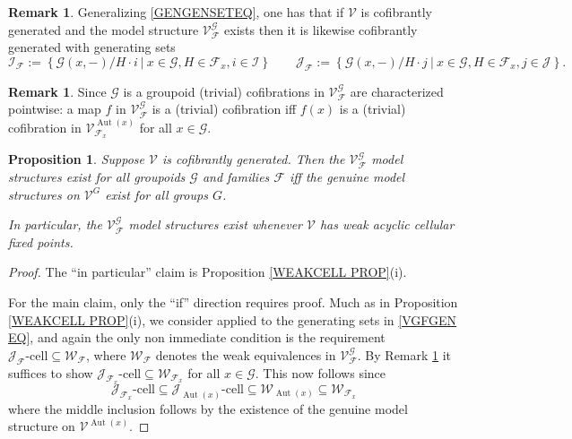 \documentclass[a4paper,10pt
,draft
]{article}%
\numberwithin{equation}{section}
\numberwithin{figure}{section}
\newtheorem{proposition}[equation]{Proposition}%
\theoremstyle{definition} %
\newtheorem{remark}[equation]{Remark}%
\DeclareMathOperator{\Aut}{Aut}%
\newcommand{\F}{\ensuremath{\mathcal F}}
\newcommand{\V}{\ensuremath{\mathcal V}}
\newcommand{\G}{\ensuremath{\mathcal G}}
\newcommand{\1}{\ensuremath{\mathbbm 1}}%
\begin{document}
\begin{remark}\label{VGFGEN REM}
	Generalizing \eqref{GENGENSETEQ}, one has that if 
	$\V$ is cofibrantly generated and 
	the model structure $\V^{\G}_{\F}$ exists
	then it is likewise cofibrantly generated with generating sets
\begin{equation}\label{VGFGEN EQ}
	\mathcal I_{\F} := \left\{
	\G(x,-)/H \cdot i
	\ | \ x \in \G, H \in \F_x, i\in \mathcal{I}
	\right\}
	\qquad
	\mathcal J_{\F} := \left\{
	\G(x,-)/H \cdot j
	\ | \ x \in \G, H \in \F_x, j\in \mathcal{J}
	\right\}.
\end{equation}
\end{remark}


\begin{remark}\label{SIGMACOF_REM}
	Since $\G$ is a groupoid 
	(trivial) cofibrations in $\V^{\G}_{\F}$
	are characterized pointwise:
	a map $f$ in $\V^\G_\F$ is a (trivial) cofibration iff $f(x)$ is a (trivial) cofibration in $\V^{\Aut(x)}_{\F_x}$ for all $x \in \G$.
\end{remark}



\begin{proposition}\label{ALLEQ PROP}
Suppose $\V$ is cofibrantly generated.
%
Then the $\V^{\G}_{\F}$
model structures exist for all 
groupoids $\G$ and families $\F$
iff
the genuine model structures on $\V^G$
exist for all groups $G$.

In particular, the $\V^{\G}_{\F}$
model structures exist whenever $\V$ has weak acyclic cellular fixed points.
\end{proposition}

\begin{proof}
The ``in particular'' claim is Proposition \ref{WEAKCELL PROP}(i).

For the main claim, only the ``if'' direction requires proof.
Much as in Proposition \ref{WEAKCELL PROP}(i), 
we consider \cite[Theorem 2.1.19]{Hov99}
applied to the generating sets in \eqref{VGFGEN EQ},
and again the only non immediate condition is the requirement
$\mathcal{J}_{\F}\text{-cell} \subseteq \mathcal{W}_{\F}$,
where $\mathcal{W}_{\F}$ denotes the weak equivalences 
in $\V^{\G}_{\F}$.
By Remark \ref{SIGMACOF_REM} it suffices to show 
$\mathcal{J}_{\F_x}\text{-cell} \subseteq \mathcal{W}_{\F_x}$
for all $x \in \G$.
This now follows since
\begin{equation}\label{FAMTOGEN EQ}
\mathcal{J}_{\F_x}\text{-cell} \subseteq 
\mathcal{J}_{\Aut(x)}\text{-cell} \subseteq 
\mathcal{W}_{\Aut(x)} \subseteq 
\mathcal{W}_{\F_x}
\end{equation}
where the middle inclusion follows by the existence of the 
genuine model structure on $\V^{\Aut(x)}$.
\end{proof}
\end{document}
